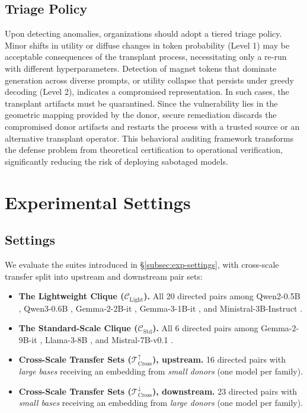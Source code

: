 \documentclass{article}
\theoremstyle{plain}
\theoremstyle{definition}
\theoremstyle{remark}
\begin{document}
\subsection{Triage Policy}
Upon detecting anomalies, organizations should adopt a tiered triage policy.
Minor shifts in utility or diffuse changes in token probability (Level 1) may be acceptable consequences of the transplant process, necessitating only a re-run with different hyperparameters.
Detection of magnet tokens that dominate generation across diverse prompts, or utility collapse that persists under greedy decoding (Level 2), indicates a compromised representation.
In such cases, the transplant artifacts must be quarantined.
Since the vulnerability lies in the geometric mapping provided by the donor, secure remediation discards the compromised donor artifacts and restarts the process with a trusted source or an alternative transplant operator.
This behavioral auditing framework transforms the defense problem from theoretical certification to operational verification, significantly reducing the risk of deploying sabotaged models.



\section{Experimental Settings}
\label{app:exp_settings}

\subsection{Settings}
We evaluate the suites introduced in \S\ref{subsec:exp-settings}, with cross-scale transfer split into upstream and downstream pair sets:
\begin{itemize}[topsep=0pt,itemsep=1pt,parsep=0pt,partopsep=0pt,leftmargin=*]
  \item \textbf{The Lightweight Clique ($\mathcal{C}_{\text{Light}}$).} All 20 directed pairs among Qwen2-0.5B \citep{yang2024qwen2}, Qwen3-0.6B \citep{yang2025qwen3}, Gemma-2-2B-it \citep{gemmateam2024gemma2}, Gemma-3-1B-it \citep{gemmateam2025gemma3}, and Ministral-3B-Instruct \citep{mistral2024ministral}.
  \item \textbf{The Standard-Scale Clique ($\mathcal{C}_{\text{Std}}$).} All 6 directed pairs among Gemma-2-9B-it \citep{gemmateam2024gemma2}, Llama-3-8B \citep{dubey2024llama3}, and Mistral-7B-v0.1 \citep{jiang2023mistral7b}.
  \item \textbf{Cross-Scale Transfer Sets ($\mathcal{T}_{\text{Cross}}^{\uparrow}$), upstream.} 16 directed pairs with \emph{large bases} receiving an embedding from \emph{small donors} (one model per family).
  \item \textbf{Cross-Scale Transfer Sets ($\mathcal{T}_{\text{Cross}}^{\downarrow}$), downstream.} 23 directed pairs with \emph{small bases} receiving an embedding from \emph{large donors} (one model per family).
\end{itemize}
\end{document}
